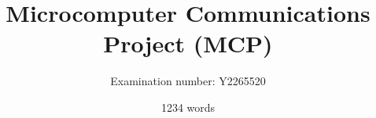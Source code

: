 \documentclass[10pt,twoside,openright]{report}
\title{Microcomputer Communications Project (MCP)}
\author{Examination number: Y2265520}
\date{1234 words}
\newenvironment{nowordcount}{}{}
\begin{document}
\maketitle

\newpage

\begin{nowordcount}
{\setlength{\parskip}{0.2\baselineskip}
    \tableofcontents
}

\newpage
{}
\end{nowordcount}








\appendix
\end{document}

